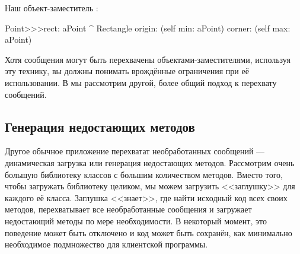 \documentclass[a4paper,10pt,twoside]{book}
\begin{document}
{%
Наш объект-заместитель :
\begin{code}{}
Point>>>rect: aPoint 
	^ Rectangle  origin: (self min: aPoint) corner: (self max: aPoint)
\end{code}

Хотя сообщения могут быть перехвачены объектами-заместителями, используя эту технику, вы должны понимать врождённые ограничения при её использовании. В  мы рассмотрим другой, более общий подход к перехвату сообщений.

\subsection{Генерация недостающих методов}

Другое обычное приложение перехватат необработанных сообщений --- динамическая загрузка или генерация недостающих методов.
Рассмотрим очень большую библиотеку классов с большим количеством методов. Вместо того, чтобы загружать библиотеку целиком, мы можем загрузить <<заглушку>> для каждого её класса. Заглушка <<знает>>, где найти исходный код всех своих методов, перехватывает все необработанные сообщения и загружает недостающий методы по мере необходимости. В некоторый момент, это поведение может быть отключено и код может быть сохранён, как минимально необходимое подмножество для клиентской программы.

}
\end{document}
